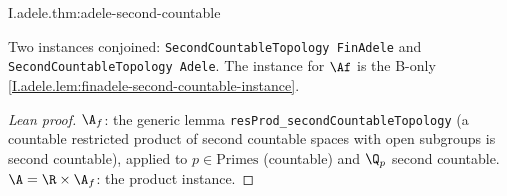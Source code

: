 \begin{theorem}
\end{theorem}
\begin{tfformal}{I.adele.thm:adele-second-countable}
\begin{tffidelity}
Two instances conjoined: \texttt{SecondCountableTopology FinAdele} and \texttt{SecondCountableTopology Adele}. The instance for $\Af$ is the B-only \cref{I.adele.lem:finadele-second-countable-instance}.
\end{tffidelity}
\end{tfformal}
\begin{proof}[Lean proof]
$\A_f$: the generic lemma \texttt{resProd\_secondCountableTopology} (a countable restricted product of second countable spaces with open subgroups is second countable), applied to $p\in\mathrm{Primes}$ (countable) and $\Q_p$ second countable. $\A=\R\times\A_f$: the product instance.
\end{proof}


